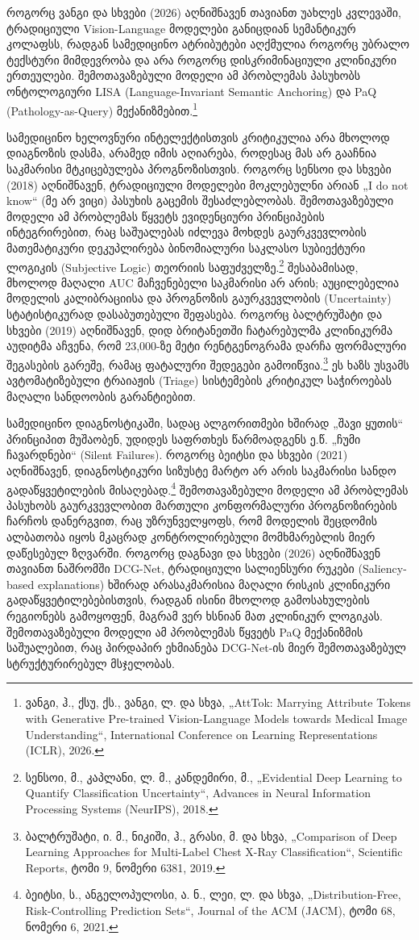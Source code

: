 \documentclass[12pt,a4paper,oneside]{report}
\begin{document}
როგორც ვანგი და სხვები (2026) აღნიშნავენ თავიანთ უახლეს კვლევაში, ტრადიციული Vision-Language მოდელები განიცდიან სემანტიკურ კოლაფსს, რადგან სამედიცინო ატრიბუტები აღქმულია როგორც უბრალო ტექსტური მიმდევრობა და არა როგორც დისკრიმინაციული კლინიკური ერთეულები. შემოთავაზებული მოდელი ამ პრობლემას პასუხობს ონტოლოგიური LISA (Language-Invariant Semantic Anchoring) და PaQ (Pathology-as-Query) მექანიზმებით.\footnote{ვანგი, ჰ., ქსუ, ქს., ვანგი, ლ. და სხვა, „AttTok: Marrying Attribute Tokens with Generative Pre-trained Vision-Language Models towards Medical Image Understanding“, International Conference on Learning Representations (ICLR), 2026.}

სამედიცინო ხელოვნური ინტელექტისთვის კრიტიკულია არა მხოლოდ დიაგნოზის დასმა, არამედ იმის აღიარება, როდესაც მას არ გააჩნია საკმარისი მტკიცებულება პროგნოზისთვის. როგორც სენსოი და სხვები (2018) აღნიშნავენ, ტრადიციული მოდელები მოკლებულნი არიან „I do not know“ (მე არ ვიცი) პასუხის გაცემის შესაძლებლობას. შემოთავაზებული მოდელი ამ პრობლემას წყვეტს ევიდენციური პრინციპების ინტეგრირებით, რაც საშუალებას იძლევა მოხდეს გაურკვევლობის მათემატიკური დეკუპლირება ბინომიალური საკლასო სუბიექტური ლოგიკის (Subjective Logic) თეორიის საფუძველზე.\footnote{სენსოი, მ., კაპლანი, ლ. მ., კანდემირი, მ., „Evidential Deep Learning to Quantify Classification Uncertainty“, Advances in Neural Information Processing Systems (NeurIPS), 2018.} შესაბამისად, მხოლოდ მაღალი AUC მაჩვენებელი საკმარისი არ არის; აუცილებელია მოდელის კალიბრაციისა და პროგნოზის გაურკვევლობის (Uncertainty) სტატისტიკურად დასაბუთებული შეფასება. როგორც ბალტრუშატი და სხვები (2019) აღნიშნავენ, დიდ ბრიტანეთში ჩატარებულმა კლინიკურმა აუდიტმა აჩვენა, რომ 23,000-ზე მეტი რენტგენოგრამა დარჩა ფორმალური შეგასების გარეშე, რამაც ფატალური შედეგები გამოიწვია.\footnote{ბალტრუშატი, ი. მ., ნიკიში, ჰ., გრასი, მ. და სხვა, „Comparison of Deep Learning Approaches for Multi-Label Chest X-Ray Classification“, Scientific Reports, ტომი 9, ნომერი 6381, 2019.} ეს ხაზს უსვამს ავტომატიზებული ტრაიაჟის (Triage) სისტემების კრიტიკულ საჭიროებას მაღალი სანდოობის გარანტიებით.

სამედიცინო დიაგნოსტიკაში, სადაც ალგორითმები ხშირად „შავი ყუთის“ პრინციპით მუშაობენ, უდიდეს საფრთხეს წარმოადგენს ე.წ. „ჩუმი ჩავარდნები“ (Silent Failures). როგორც ბეიტსი და სხვები (2021) აღნიშნავენ, დიაგნოსტიკური სიზუსტე მარტო არ არის საკმარისი სანდო გადაწყვეტილების მისაღებად.\footnote{ბეიტსი, ს., ანგელოპულოსი, ა. ნ., ლეი, ლ. და სხვა, „Distribution-Free, Risk-Controlling Prediction Sets“, Journal of the ACM (JACM), ტომი 68, ნომერი 6, 2021.} შემოთავაზებული მოდელი ამ პრობლემას პასუხობს გაურკვევლობით მართული კონფორმალური პროგნოზირების ჩარჩოს დანერგვით, რაც უზრუნველყოფს, რომ მოდელის შეცდომის ალბათობა იყოს მკაცრად კონტროლირებული მომხმარებლის მიერ დაწესებულ ზღვარში. როგორც დაგნავი და სხვები (2026) აღნიშნავენ თავიანთ ნაშრომში DCG-Net, ტრადიციული სალიენსური რუკები (Saliency-based explanations) ხშირად არასაკმარისია მაღალი რისკის კლინიკური გადაწყვეტილებებისთვის, რადგან ისინი მხოლოდ გამოსახულების რეგიონებს გამოყოფენ, მაგრამ ვერ ხსნიან მათ კლინიკურ ლოგიკას. შემოთავაზებული მოდელი ამ პრობლემას წყვეტს PaQ მექანიზმის საშუალებით, რაც პირდაპირ ეხმიანება DCG-Net-ის მიერ შემოთავაზებულ სტრუქტურირებულ მსჯელობას.
\end{document}
